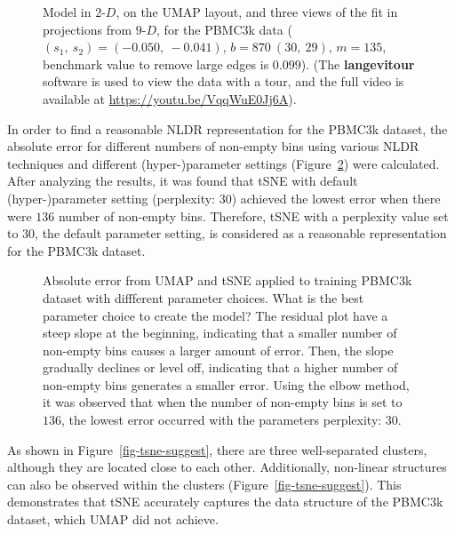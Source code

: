 \documentclass[
  12pt]{article}
\newcommand\gD{$2\text{-}D$}
\begin{document}
\begin{figure}[H]
\caption{\label{fig-pbmc1-sc}Model in \gD{}, on the UMAP layout, and
three views of the fit in projections from \(9\text{-}D\), for the
PBMC3k data (\((s_1, \ s_2) = (-0.050, \ -0.041)\),
\(b = 870 \  (30, \ 29)\), \(m = 135\), benchmark value to remove large
edges is \(0.099\)). (The \textbf{langevitour} software is used to view
the data with a tour, and the full video is available at
\url{https://youtu.be/VqqWuE0Jj6A}).}

\end{figure}%

In order to find a reasonable NLDR representation for the PBMC3k
dataset, the absolute error for different numbers of non-empty bins
using various NLDR techniques and different (hyper-)parameter settings
(Figure~\ref{fig-pbmc-abserror}) were calculated. After analyzing the
results, it was found that tSNE with default (hyper-)parameter setting
(perplexity: \(30\)) achieved the lowest error when there were \(136\)
number of non-empty bins. Therefore, tSNE with a perplexity value set to
\(30\), the default parameter setting, is considered as a reasonable
representation for the PBMC3k dataset.

\begin{figure}[H]


\caption{\label{fig-pbmc-abserror}Absolute error from UMAP and tSNE
applied to training PBMC3k dataset with diffferent parameter choices.
What is the best parameter choice to create the model? The residual plot
have a steep slope at the beginning, indicating that a smaller number of
non-empty bins causes a larger amount of error. Then, the slope
gradually declines or level off, indicating that a higher number of
non-empty bins generates a smaller error. Using the elbow method, it was
observed that when the number of non-empty bins is set to \(136\), the
lowest error occurred with the parameters perplexity: \(30\).}

\end{figure}%

As shown in Figure~\ref{fig-tsne-suggest}, there are three
well-separated clusters, although they are located close to each other.
Additionally, non-linear structures can also be observed within the
clusters (Figure~\ref{fig-tsne-suggest}). This demonstrates that tSNE
accurately captures the data structure of the PBMC3k dataset, which UMAP
did not achieve.
\end{document}
